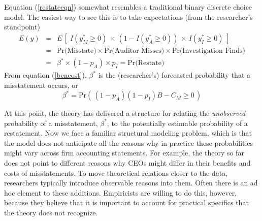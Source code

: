 Equation (\ref{restateeqn}) somewhat resembles a traditional binary discrete choice model. The easiest
way to see this is to take expectations (from the researcher's standpoint)
\begin{equation} \label{equilpr}
\begin{array}{lcl}
 E(y) & = & E\, \left[\; I(y^*_M \ge 0) \, \times\, (1 - I(y^*_A \ge 0)) \, \times\, I(y^*_I \ge 0) \; \right]\\[1em]
 & = &  \mbox{Pr(Misstate)} \times \mbox{Pr(Auditor Misses)} \times
\mbox{Pr(Investigation Finds)}\\[1em]
& = & \beta^* \times (1-p_A) \times p_{I} = \mbox{Pr(Restate)}
\end{array}\end{equation}
From equation (\ref{bencost}), $\beta^*$ is the (researcher's) forecasted probability that a misstatement occurs, or
\begin{equation}\label{betaplus}
\beta^*= \mbox{Pr}\left(\, (1 - p_A)(1 - p_I) B - C_M \ge 0 \,\right)
\end{equation}

At this point, the theory has delivered a structure for relating the \emph{unobserved} probability of a misstatement, $\beta^*$, to the potentially estimable probability of a restatement.
Now we face a familiar structural modeling problem, which is that the model does not anticipate all the reasons why in practice these probabilities might vary across firm accounting statements.
For example, the theory so far does not point to different reasons why CEOs might differ in their benefits and costs of misstatements. 
To move theoretical relations closer to the data, researchers typically introduce observable reasons into them. 
Often there is an ad hoc element to these additions. 
Empiricists are willing to do this, however, because they believe that it is important to account for practical specifics that the theory does not recognize.

